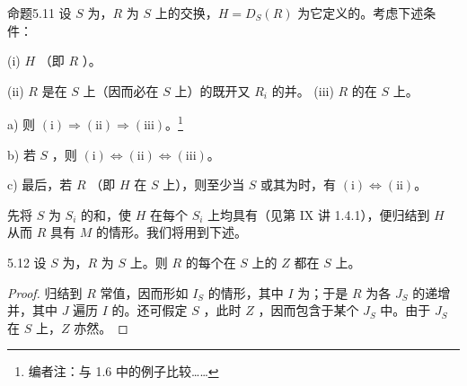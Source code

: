 \begin{SGAresult}{命题}{5.11}
设 $S$ 为，$R$ 为 $S$ 上的交换，$H=D_S(R)$ 为它定义的。考虑下述条件：

(i) $H$ （即 $R$ ）。

(ii) $R$ 是在 $S$ 上（因而必在 $S$ 上）的既开又 $R_i$ 的并。
(iii) $R$ 的在 $S$ 上。

 a) 则 $(\mathrm i)\Rightarrow(\mathrm{ii})\Rightarrow(\mathrm{iii})$。\footnote[40]{编者注：与 1.6 中的例子比较……}

 b) 若 $S$ ，则 $(\mathrm i)\Leftrightarrow(\mathrm{ii})\Leftrightarrow(\mathrm{iii})$。

 c) 最后，若 $R$ （即 $H$ 在 $S$ 上），则至少当 $S$ 或其为时，有 $(\mathrm i)\Leftrightarrow(\mathrm{ii})$。
\end{SGAresult}
先将 $S$ 为 $S_i$ 的和，使 $H$ 在每个 $S_i$ 上均具有（见第 IX 讲 1.4.1），便归结到 $H$ 从而 $R$ 具有 $M$ 的情形。我们将用到下述。
\begin{SGAresult}{}{5.12}
设 $S$ 为，$R$ 为 $S$ 上。则 $R$ 的每个在 $S$ 上的 $Z$ 都在 $S$ 上。
\end{SGAresult}
\begin{proof}
归结到 $R$ 常值，因而形如 $I_S$ 的情形，其中 $I$ 为；于是 $R$ 为各 $J_S$ 的递增并，其中 $J$ 遍历 $I$ 的。还可假定 $S$ ，此时 $Z$ ，因而包含于某个 $J_S$ 中。由于 $J_S$ 在 $S$ 上，$Z$ 亦然。
\end{proof}

